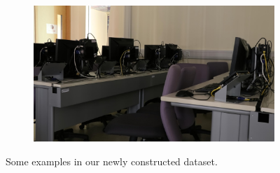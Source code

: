 \begin{figure}
\begin{subfigure}[t]{0.32\textwidth}
    \end{subfigure}
    \hfill
    \begin{subfigure}[t]{0.32\textwidth}
        \centering
        \includegraphics[width=1\textwidth]{images/dataset/Canon80D_8_8_6400_comproom_mean.JPG}
    \end{subfigure}
    \caption{Some examples in our newly constructed dataset.}
    \label{fig6-2}
\end{figure}


